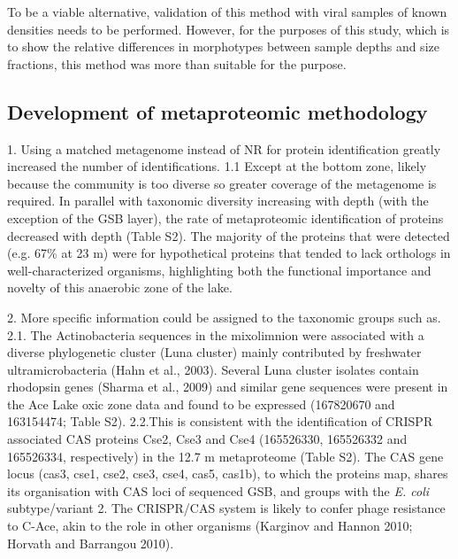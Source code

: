 To be a viable alternative, validation of this method with viral samples of known densities needs to be performed. 
However, for the purposes of this study, which is to show the relative differences in morphotypes between sample depths and size fractions, this method was more than suitable for the purpose.

\subsection{Development of metaproteomic methodology}

1. Using a matched metagenome instead of \ac{NR} for protein identification greatly increased the number of identifications.
1.1 Except at the bottom zone, likely because the community is too diverse so greater coverage of the metagenome is required. %
In parallel with taxonomic diversity increasing with depth (with the exception of the GSB layer), the rate of metaproteomic identification of proteins decreased with depth (Table S2). 
The majority of the proteins that were detected (e.g. 67\% at 23 m) were for hypothetical proteins that tended to lack orthologs in well-characterized organisms, highlighting both the functional importance and novelty of this anaerobic zone of the lake.



2. More specific information could be assigned to the taxonomic groups such as.
2.1. The Actinobacteria sequences in the mixolimnion were associated with a diverse phylogenetic cluster (Luna cluster) mainly contributed by freshwater ultramicrobacteria (Hahn et al., 2003). 
Several Luna cluster isolates contain rhodopsin genes (Sharma et al., 2009) and similar gene sequences were present in the Ace Lake oxic zone data and found to be expressed (167820670 and 163154474; Table S2).
2.2.This is consistent with the identification of \ac{CRISPR} associated \ac{CAS} proteins Cse2, Cse3 and Cse4 (165526330, 165526332 and 165526334, respectively) in the 12.7 m metaproteome (Table S2). 
The \ac{CAS} gene locus (cas3, cse1, cse2, cse3, cse4, cas5, cas1b), to which the proteins map, shares its organisation with \ac{CAS} loci of sequenced \ac{GSB}, and groups with the \emph{E. coli} subtype/variant 2. The \ac{CRISPR}/\ac{CAS} system is likely to confer phage resistance to C-Ace, akin to the role in other organisms (Karginov and Hannon 2010; Horvath and Barrangou 2010).

